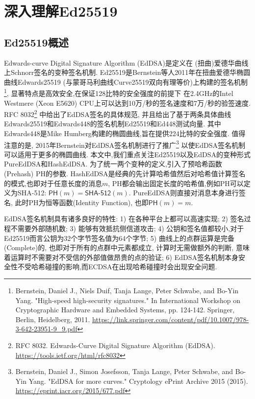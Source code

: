 \section{深入理解Ed25519}

\subsection{Ed25519概述}

Edwards-curve Digital Signature Algorithm (EdDSA)是定义在
(扭曲)爱德华曲线上Schnorr签名的变种签名机制.
Ed25519是Bernstein等人2011年在扭曲爱德华椭圆曲线Edwards25519 
(与蒙哥马利曲线Curve25519双向有理等价)上构建的签名机制\footnote{
Bernstein, Daniel J., Niels Duif, Tanja Lange, Peter Schwabe, and Bo-Yin Yang. 
"High-speed high-security signatures." 
In International Workshop on Cryptographic Hardware and Embedded Systems, 
pp. 124-142. Springer, Berlin, Heidelberg, 2011.
\url{https://link.springer.com/content/pdf/10.1007/978-3-642-23951-9_9.pdf}},
显著特点是高效安全,在保证128比特的安全强度的前提下
在2.4GHz的Intel Westmere (Xeon E5620) CPU上可以达到10万/秒的签名速度和7万/秒的验签速度.
RFC 8032\footnote{
RFC 8032. Edwards-Curve Digital Signature Algorithm (EdDSA).
\url{https://tools.ietf.org/html/rfc8032}}
中给出了EdDSA签名的具体规范,
并且给出了基于两条具体曲线Edwards25519和Edwards448的签名机制Ed25519和Ed448测试向量.
其中Edwards448是Mike Humberg构建的椭圆曲线,旨在提供224比特的安全强度.
值得注意的是, 2015年Bernstein对EdDSA签名机制进行了推广\footnote{
Bernstein, Daniel J., Simon Josefsson, Tanja Lange, Peter Schwabe, and Bo-Yin Yang. 
"EdDSA for more curves." Cryptology ePrint Archive 2015 (2015).
\url{https://eprint.iacr.org/2015/677.pdf}}
以使EdDSA签名机制可以适用于更多的椭圆曲线.
本文中,我们重点关注Ed25519以及EdDSA的变种形式PureEdDSA和HashEdDSA.
为了统一两个变种的定义,引入了预哈希函数(Prehash) \textsf{PH}的参数.
HashEdDSA是经典的先计算哈希值然后对哈希值计算签名的模式,也即对于任意长度的消息$m$,
\textsf{PH}都会输出固定长度的哈希值,例如\textsf{PH}可以定义为\textsf{SHA-512}: 
$\textsf{PH}(m) = \textsf{SHA-512}(m)$. PureEdDSA则直接对消息本身进行签名,
此时\textsf{PH}为恒等函数(Identity Function), 也即$\textsf{PH}(m) = m$.


EdDSA签名机制具有诸多良好的特性: 
1) 在各种平台上都可以高速实现; 2) 签名过程不需要外部随机数; 3) 能够有效抵抗侧信道攻击;
4) 公钥和签名值都较小,对于Ed25519而言公钥为32个字节签名值为64个字节;
5) 曲线上的点群运算是完备(Complete)的, 也即对于所有的点群中元素都成立, 计算时无需做额外的判断, 
意味着运算时不需要对不受信的外部值做昂贵的点的验证; 
6) EdDSA签名机制本身安全性不受哈希碰撞的影响,而ECDSA在出现哈希碰撞时会出现安全问题.

